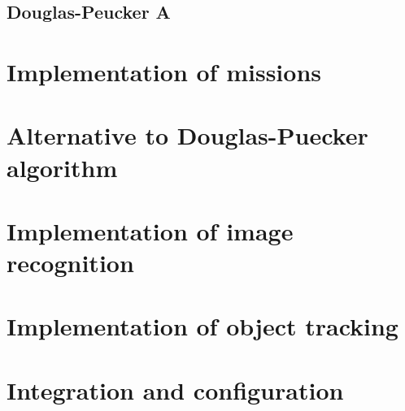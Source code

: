 \subsection{Douglas-Peucker A}

\section{Implementation of missions}

\section{Alternative to Douglas-Puecker algorithm}

\section{Implementation of image recognition}

\section{Implementation of object tracking}

\section{Integration and configuration}






